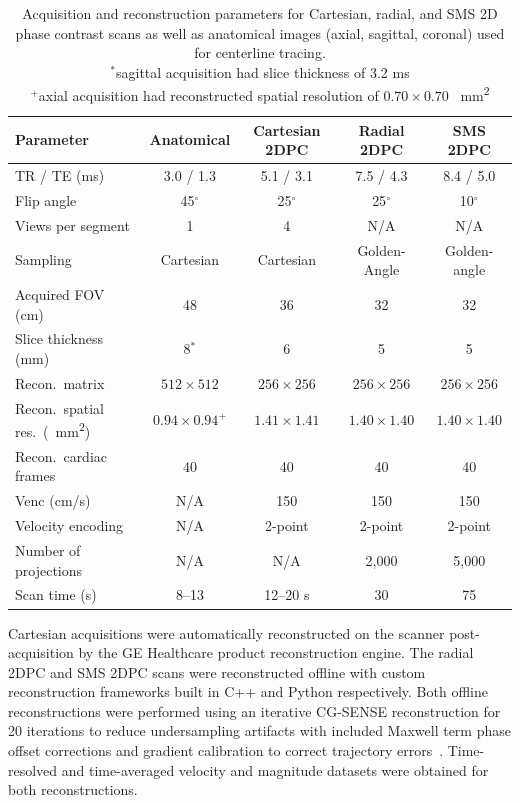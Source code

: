 \begin{table}[ht]
    \centering
    \caption[2D phase contrast scan parameters]{Acquisition and reconstruction parameters for Cartesian, radial, and SMS 2D phase contrast scans as well as anatomical images (axial, sagittal, coronal) used for centerline tracing. \\      $^*$sagittal acquisition had slice thickness of 3.2 ms \\
    $^+$axial acquisition had reconstructed spatial resolution of $0.70 \times 0.70$ \qty{}{\mm^2}}\label{tab:scan_params}
    \footnotesize
    \ifFinal{}
    \fi
    \vspace{0.25cm}
    \begin{tabular}{lcccc}
    \toprule
    \textbf{Parameter} & \textbf{Anatomical} & \textbf{Cartesian 2DPC} & \textbf{Radial 2DPC} & \textbf{SMS 2DPC} \\
    \midrule
    TR / TE (ms) & 3.0 / 1.3 &  5.1 / 3.1 & 7.5 / 4.3 & 8.4 / 5.0 \\
    Flip angle & 45$^\circ$ & 25$^\circ$ & 25$^\circ$ & 10$^\circ$ \\
    Views per segment & 1 & 4 & N/A & N/A \\
    Sampling & Cartesian & Cartesian & Golden-Angle & Golden-angle \\
    Acquired FOV (cm) & 48 & 36 & 32 & 32 \\
    Slice thickness (mm) & 8$^*$ & 6 & 5 & 5 \\
    Recon.\ matrix & $512 \times 512$ &  $256 \times 256$ & $256 \times 256$ & $256 \times 256$ \\
    Recon.\ spatial res.\ (\qty{}{\mm^2}) & $0.94 \times 0.94^+$ & $1.41 \times 1.41$ & $1.40 \times 1.40$ & $1.40 \times 1.40$ \\
    Recon.\ cardiac frames & 40 & 40 & 40 & 40 \\
    Venc (cm/s) & N/A & 150 & 150 & 150 \\
    Velocity encoding & N/A & 2-point & 2-point & 2-point \\
    Number of projections & N/A & N/A & 2,000 & 5,000 \\
    Scan time (s) & 8--13 & 12--20 s & 30 & 75 \\
    \bottomrule
    \end{tabular}
\end{table}

Cartesian acquisitions were automatically reconstructed on the scanner post-acquisition by the GE Healthcare product reconstruction engine. The radial 2DPC and SMS 2DPC scans were reconstructed offline with custom reconstruction frameworks built in C++ and Python respectively. Both offline reconstructions were performed using an iterative CG-SENSE reconstruction for 20 iterations to reduce undersampling artifacts with included Maxwell term phase offset corrections and gradient calibration to correct trajectory errors~\cite{pruessmann2001, bernsteinConcomitantGradientTerms1998, johnsonImproved3DPhase2008}. Time-resolved and time-averaged velocity and magnitude datasets were obtained for both reconstructions.


